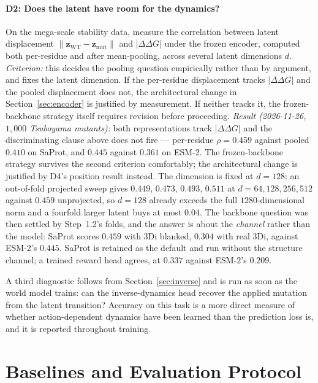 \documentclass[12pt, a4paper]{article}
\begin{document}
\paragraph{D2: Does the latent have room for the dynamics?} On the mega-scale stability data, measure the correlation between latent displacement $\lVert \mathbf{z}_{\mathrm{WT}} - \mathbf{z}_{\mathrm{mut}} \rVert$ and $\lvert \Delta\Delta G \rvert$ under the frozen encoder, computed both per-residue and after mean-pooling, across several latent dimensions $d$. \textit{Criterion:} this decides the pooling question empirically rather than by argument, and fixes the latent dimension. If the per-residue displacement tracks $\lvert \Delta\Delta G \rvert$ and the pooled displacement does not, the architectural change in Section~\ref{sec:encoder} is justified by measurement. If neither tracks it, the frozen-backbone strategy itself requires revision before proceeding. \textit{Result (2026-11-26, $1{,}000$ Tsuboyama mutants):} both representations track $\lvert\Delta\Delta G\rvert$ and the discriminating clause above does not fire --- per-residue $\rho = 0.459$ against pooled $0.410$ on SaProt, and $0.445$ against $0.361$ on ESM-2. The frozen-backbone strategy survives the second criterion comfortably; the architectural change is justified by D4's position result instead. The dimension is fixed at $d = 128$: an out-of-fold projected sweep gives $0.449$, $0.473$, $0.493$, $0.511$ at $d = 64, 128, 256, 512$ against $0.459$ unprojected, so $d = 128$ already exceeds the full $1280$-dimensional norm and a fourfold larger latent buys at most $0.04$. The backbone question was then settled by Step~1.2's folds, and the answer is about the \textit{channel} rather than the model: SaProt scores $0.459$ with $3$Di blanked, $0.304$ with real $3$Di, against ESM-2's $0.445$. SaProt is retained as the default and run without the structure channel; a trained reward head agrees, at $0.337$ against ESM-2's $0.209$.

A third diagnostic follows from Section~\ref{sec:inverse} and is run as soon as the world model trains: can the inverse-dynamics head recover the applied mutation from the latent transition? Accuracy on this task is a more direct measure of whether action-dependent dynamics have been learned than the prediction loss is, and it is reported throughout training.

\section{Baselines and Evaluation Protocol}
\label{sec:evaluation}
\end{document}
